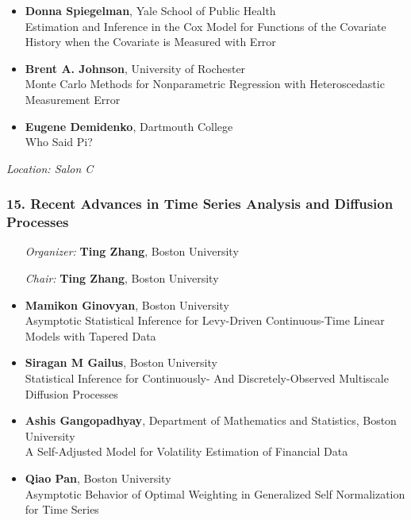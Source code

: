 \begin{itemize}
\item \textbf{Donna Spiegelman}, Yale School of Public Health \\
Estimation and Inference in the Cox Model for Functions of the Covariate History when the Covariate is Measured with Error
\item \textbf{Brent A. Johnson}, University of Rochester \\
Monte Carlo Methods for Nonparametric Regression with Heteroscedastic Measurement Error
\item \textbf{Eugene Demidenko}, Dartmouth College \\
Who Said Pi?
\end{itemize}

\emph{Location: Salon C}

\subsubsection*{15. Recent Advances in Time Series Analysis and Diffusion Processes}

\begin{enumerate}[align=left]
\item [\emph{Organizer:}] \textbf{Ting Zhang}, Boston University
\item [\emph{Chair:}] \textbf{Ting Zhang}, Boston University
\end{enumerate}

\begin{itemize}
\item \textbf{Mamikon Ginovyan}, Boston University \\
Asymptotic Statistical Inference for Levy-Driven Continuous-Time Linear Models with Tapered Data
\item \textbf{Siragan M Gailus}, Boston University \\
Statistical Inference for Continuously- And Discretely-Observed Multiscale Diffusion Processes
\item \textbf{Ashis Gangopadhyay}, Department of Mathematics and Statistics, Boston University \\
A Self-Adjusted Model for Volatility Estimation of Financial Data
\item \textbf{Qiao Pan}, Boston University \\
Asymptotic Behavior of Optimal Weighting in Generalized Self Normalization for Time Series
\end{itemize}

